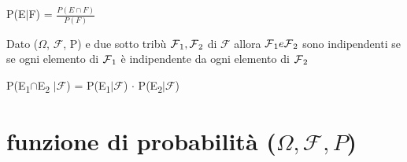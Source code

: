 \documentclass[11pt, letterpaper]{article}
\def\SB#1{\textsubscript{#1}}
\begin{document}
\begin{center}
    P(E$|$F) = $\frac{P(E\cap F)}{P(F)}$
\end{center}


Dato ($\Omega$, $\mathcal{F}$, P) e due sotto tribù $\mathcal{F}\SB{1},\mathcal{F}\SB{2}$ di $\mathcal{F}$
allora $\mathcal{F}\SB{1}e\mathcal{F}\SB{2}$ sono indipendenti se se ogni elemento di $\mathcal{F}\SB{1}$ è indipendente
da ogni elemento di $\mathcal{F}\SB{2}$
\begin{center}
P(E\SB{1}$\cap$E\SB{2} $\vert\mathcal{F}$) = P(E\SB{1}$\vert\mathcal{F}$) $\cdot$ P(E\SB{2}$\vert\mathcal{F}$)    
\end{center}

\clearpage
\section{funzione di probabilità ($\Omega,\mathcal{F},P$)}
\end{document}

